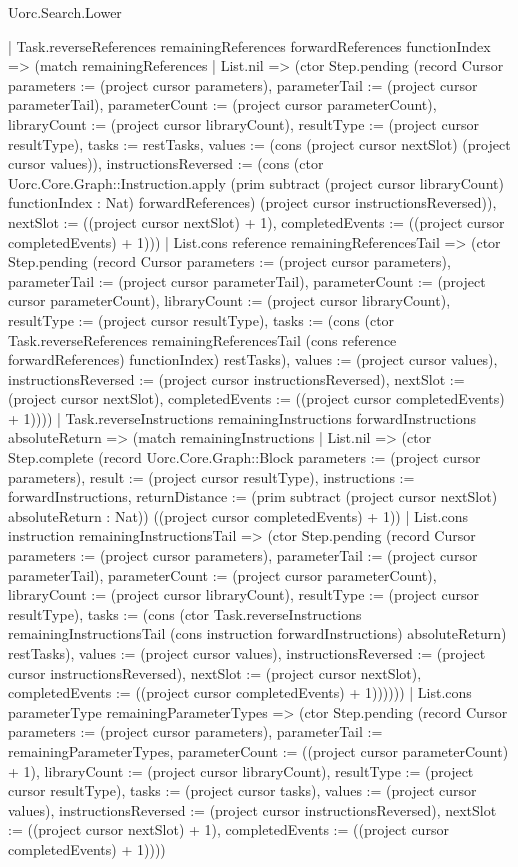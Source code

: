 \begin{lexlean}{Uorc.Search.Lower}
\begin{semanticmodule}
{        | Task.reverseReferences remainingReferences forwardReferences functionIndex => (match remainingReferences
          | List.nil => (ctor Step.pending (record Cursor {parameters := (project cursor parameters), parameterTail := (project cursor parameterTail), parameterCount := (project cursor parameterCount), libraryCount := (project cursor libraryCount), resultType := (project cursor resultType), tasks := restTasks, values := (cons (project cursor nextSlot) (project cursor values)), instructionsReversed := (cons (ctor Uorc.Core.Graph::Instruction.apply (prim subtract (project cursor libraryCount) functionIndex : Nat) forwardReferences) (project cursor instructionsReversed)), nextSlot := ((project cursor nextSlot) + 1), completedEvents := ((project cursor completedEvents) + 1)}))
          | List.cons reference remainingReferencesTail => (ctor Step.pending (record Cursor {parameters := (project cursor parameters), parameterTail := (project cursor parameterTail), parameterCount := (project cursor parameterCount), libraryCount := (project cursor libraryCount), resultType := (project cursor resultType), tasks := (cons (ctor Task.reverseReferences remainingReferencesTail (cons reference forwardReferences) functionIndex) restTasks), values := (project cursor values), instructionsReversed := (project cursor instructionsReversed), nextSlot := (project cursor nextSlot), completedEvents := ((project cursor completedEvents) + 1)})))
        | Task.reverseInstructions remainingInstructions forwardInstructions absoluteReturn => (match remainingInstructions
          | List.nil => (ctor Step.complete (record Uorc.Core.Graph::Block {parameters := (project cursor parameters), result := (project cursor resultType), instructions := forwardInstructions, returnDistance := (prim subtract (project cursor nextSlot) absoluteReturn : Nat)}) ((project cursor completedEvents) + 1))
          | List.cons instruction remainingInstructionsTail => (ctor Step.pending (record Cursor {parameters := (project cursor parameters), parameterTail := (project cursor parameterTail), parameterCount := (project cursor parameterCount), libraryCount := (project cursor libraryCount), resultType := (project cursor resultType), tasks := (cons (ctor Task.reverseInstructions remainingInstructionsTail (cons instruction forwardInstructions) absoluteReturn) restTasks), values := (project cursor values), instructionsReversed := (project cursor instructionsReversed), nextSlot := (project cursor nextSlot), completedEvents := ((project cursor completedEvents) + 1)})))))
    | List.cons parameterType remainingParameterTypes => (ctor Step.pending (record Cursor {parameters := (project cursor parameters), parameterTail := remainingParameterTypes, parameterCount := ((project cursor parameterCount) + 1), libraryCount := (project cursor libraryCount), resultType := (project cursor resultType), tasks := (project cursor tasks), values := (project cursor values), instructionsReversed := (project cursor instructionsReversed), nextSlot := ((project cursor nextSlot) + 1), completedEvents := ((project cursor completedEvents) + 1)})))
}


\end{semanticmodule}
\end{lexlean}
